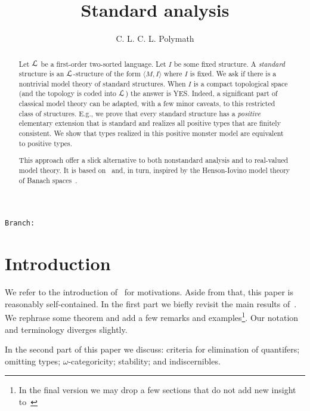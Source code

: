 \documentclass[10pt,oneside]{amsproc}
\author{C. L. C. L. Polymath}
\newcommand\branch{}
\begin{document}
\title{Standard analysis}
\hfill\texttt{Branch:\ \branch\ \DTMnow}\bigskip
\maketitle
\raggedbottom

\begin{abstract}
  Let ${\EuScript L}$ be a first-order two-sorted language.
  Let $I$ be some fixed structure.
  A \textit{standard\/} structure is an ${\EuScript L}$-structure of the form $\langle M,I\rangle$ where $I$ is fixed.
  We ask if there is a nontrivial model theory of standard structures.
  When $I$ is a compact topological space (and the topology is coded into ${\EuScript L}$) the answer is YES.
  Indeed, a significant part of classical model theory can be adapted, with a few minor caveats, to this restricted class of structures.
  E.g., we prove that every standard structure has a \textit{positive\/} elementary extension that is standard and realizes all positive types that are finitely consistent.
  We show that types realized in this positive monster model are equivalent to positive types.
  
  \noindent This approach offer a slick alternative to both nonstandard analysis and to real-valued model theory.
  It is based on~\cite{clcl} and, in turn, inspired by the Henson-Iovino model theory of Banach spaces~\cite{HI}.
\end{abstract}

\section{Introduction}\label{intro}

We refer to the introduction of~\cite{clcl} for motivations.
Aside from that, this paper is reasonably self-contained.
In the first part we biefly revisit the main results of~\cite{clcl}.
We rephrase some theorem and add a few remarks and examples\footnote{In the final version we may drop a few sections that do not add new insight to~\cite{clcl}}.
Our notation and terminology diverges slightly.

In the second part of this paper we discuss: criteria for elimination of quantifers; omitting types; $\omega$-categoricity; stability; and indiscernibles.
\end{document}
